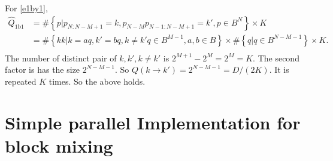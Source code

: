 \documentclass[a4paper]{article}
\newcommand{\cbr}[1]{\left\{#1\right\}}
\begin{document}
For \eqref{e1by1},
\begin{align*}
 \hat{Q}_{\text{1b1}} &= \# \cbr{p| p_{N:N-M+1} = k, p_{N-M}p_{N-1:N-M+1} = k', p\in B^N} \times K\\
&= \# \cbr{kk| k = aq, k'=bq, k\neq k' q\in B^{M-1},a, b\in B}\times \#\cbr{q| q\in B^{N-M-1}}\times K.\\
\end{align*}
 The number of distinct pair of \(k, k', k\neq k'\) is \(2^{M+1} - 2^M = 2^M = K\).  The second factor is has the size \(2^{N-M-1}\). So \( Q(k\to k') = 2^{N-M-1} = D/(2K)\). It is repeated \(K\) times. So the above holds.

\section{Simple parallel Implementation for block mixing}
\end{document}
